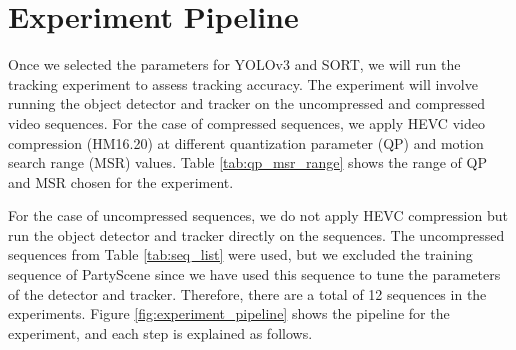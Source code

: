 \section{Experiment Pipeline}
\label{sec:methods/section_c}

Once we selected the parameters for YOLOv3 and SORT, we will run the tracking experiment to assess tracking accuracy. The experiment will involve running the object detector and tracker on the uncompressed and compressed video sequences. For the case of compressed sequences, we apply HEVC video compression (HM16.20) at different quantization parameter (QP) and motion search range (MSR) values. Table \ref{tab:qp_msr_range} shows the range of QP and MSR chosen for the experiment.

For the case of uncompressed sequences, we do not apply HEVC compression but run the object detector and tracker directly on the sequences. The uncompressed sequences from Table \ref{tab:seq_list} were used, but we excluded the training sequence of PartyScene since we have used this sequence to tune the parameters of the detector and tracker. Therefore, there are a total of 12 sequences in the experiments. Figure \ref{fig:experiment_pipeline} shows the pipeline for the experiment, and each step is explained as follows.



